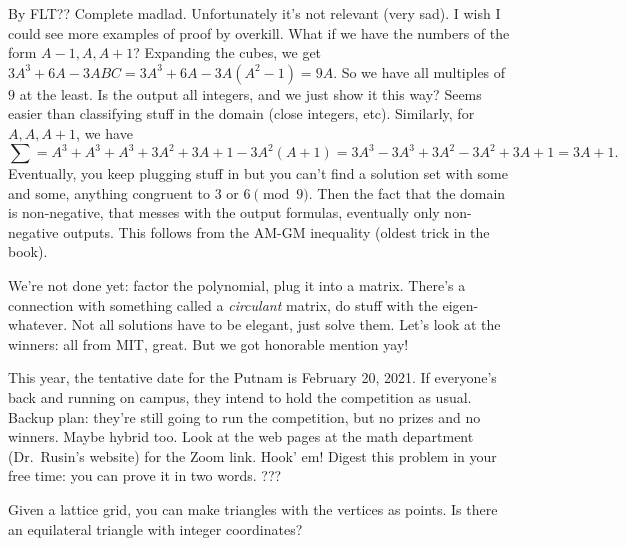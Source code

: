 By FLT?? Complete madlad. Unfortunately it's not relevant (very sad). I wish I could see more examples of proof by overkill. What if we have the numbers of the form $A-1,A,A+1$? Expanding the cubes, we get $3A^3+6A-3ABC=3A^3+6A-3A(A^2-1)=9A$. So we have all multiples of $9$ at the least. Is the output all integers, and we just show it this way? Seems easier than classifying stuff in the domain (close integers, etc). Similarly, for $A,A,A+1$, we have \[
    \sum = A^3+A^3+A^3+3A^2+3A+1-3A^2(A+1)=3A^3-3A^3+3A^2-3A^2+3A+1=3A+1.
\] Eventually, you keep plugging stuff in but you can't find a solution set with some and some, anything congruent to $3$ or $6\pmod 9$. Then the fact that the domain is non-negative, that messes with the output formulas, eventually only non-negative outputs. This follows from the AM-GM inequality (oldest trick in the book).

We're not done yet: factor the polynomial, plug it into a matrix. There's a connection with something called a \emph{circulant} matrix, do stuff with the eigen-whatever. Not all solutions have to be elegant, just solve them. Let's look at the winners: all from MIT, great. But we got honorable mention yay!

\orbreak
This year, the tentative date for the Putnam is February 20, 2021. If everyone's back and running on campus, they intend to hold the competition as usual. Backup plan: they're still going to run the competition, but no prizes and no winners. Maybe hybrid too. Look at the web pages at the math department (Dr.\ Rusin's website) for the Zoom link. Hook' em!
\orbreak
Digest this problem in your free time: you can prove it in two words. ???
\begin{prob}
     Given a lattice grid, you can make triangles with the vertices as points. Is there an equilateral triangle with integer coordinates?
\end{prob}

